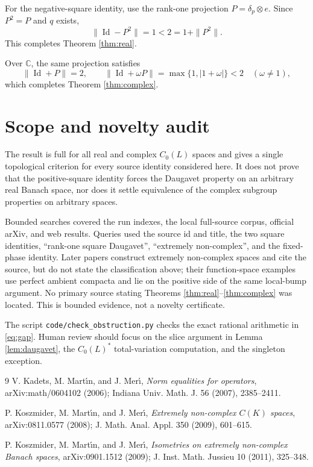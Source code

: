 \documentclass[11pt]{article}
\theoremstyle{remark}
\newcommand{\Id}{\operatorname{Id}}
\begin{document}
For the negative-square identity, use the rank-one projection
$P=\delta_p\otimes e$.  Since $P^2=P$ and $q$ exists,
\[
 \|\Id-P^2\|=1<2=1+\|P^2\|.
\]
This completes Theorem \ref{thm:real}.

Over $\mathbb C$, the same projection satisfies
\[
 \|\Id+P\|=2,
 \qquad
 \|\Id+\omega P\|=\max\{1,|1+\omega|\}<2
 \quad(\omega\ne1),
\]
which completes Theorem \ref{thm:complex}.

\section{Scope and novelty audit}

The result is full for all real and complex $C_0(L)$ spaces and gives a
single topological criterion for every source identity considered here.  It
does not prove that the positive-square identity forces the Daugavet property
on an arbitrary real Banach space, nor does it settle equivalence of the
complex subgroup properties on arbitrary spaces.

Bounded searches covered the run indexes, the local full-source corpus,
official arXiv, and web results.  Queries used the source id and title, the
two square identities, ``rank-one square Daugavet'', ``extremely
non-complex'', and the fixed-phase identity.  Later papers
\cite{KMMext,KMMiso} construct extremely non-complex spaces and cite the
source, but do not state the classification above; their function-space
examples use perfect ambient compacta and lie on the positive side of the
same local-bump argument.  No primary source stating Theorems
\ref{thm:real}--\ref{thm:complex} was located.  This is bounded evidence, not
a novelty certificate.

The script \texttt{code/check\_obstruction.py} checks the exact rational
arithmetic in \eqref{eq:gap}.  Human review should focus on the slice argument
in Lemma \ref{lem:daugavet}, the $C_0(L)^*$ total-variation computation, and
the singleton exception.

\begin{thebibliography}{9}
V. Kadets, M. Mart\'{\i}n, and J. Mer\'{\i},
\emph{Norm equalities for operators}, arXiv:math/0604102 (2006);
Indiana Univ. Math. J. 56 (2007), 2385--2411.

P. Koszmider, M. Mart\'{\i}n, and J. Mer\'{\i},
\emph{Extremely non-complex $C(K)$ spaces}, arXiv:0811.0577 (2008);
J. Math. Anal. Appl. 350 (2009), 601--615.

P. Koszmider, M. Mart\'{\i}n, and J. Mer\'{\i},
\emph{Isometries on extremely non-complex Banach spaces},
arXiv:0901.1512 (2009); J. Inst. Math. Jussieu 10 (2011), 325--348.
\end{thebibliography}
\end{document}
